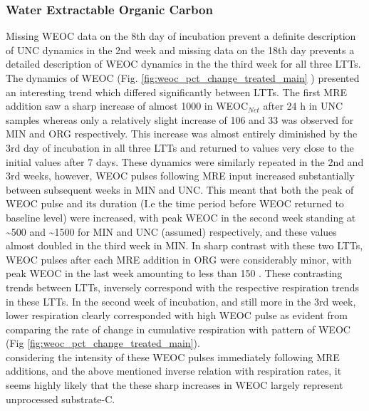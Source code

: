 		\subsubsection{Water Extractable Organic Carbon}

			Missing WEOC data on the 8th day of incubation prevent a definite description of UNC dynamics in the 2nd week and missing data on the 18th day prevents a detailed description of WEOC dynamics in the the third week for all three LTTs. The dynamics of WEOC (Fig. \ref{fig:weoc_pct_change_treated_main} ) presented an interesting trend which differed significantly between LTTs. The first MRE addition saw a sharp increase of almost 1000 \genericunit in WEOC$_{Net}$ after 24 h in UNC samples whereas only a relatively slight increase of 106 and 33 \genericunit was observed for MIN and ORG respectively. This increase was almost entirely diminished by the 3rd day of incubation in all three LTTs and returned to values very close to the initial values after 7 days. These dynamics were similarly repeated in the 2nd and 3rd weeks, however, WEOC pulses following MRE input increased substantially between subsequent weeks in MIN and UNC. This meant that both the peak of WEOC pulse and its duration (I.e the time period before WEOC returned to baseline level) were increased, with peak WEOC in the second week standing at \~{}500 and \~{}1500 \genericunit for MIN and UNC (assumed) respectively, and these values almost doubled in the third week in MIN. In sharp contrast with these two LTTs, WEOC pulses after each MRE addition in ORG were considerably minor, with peak WEOC in the last week amounting to less than 150 \genericunit.
			These contrasting trends between LTTs, inversely correspond with the respective respiration trends in these LTTs. In the second week of incubation, and still more in the 3rd week, lower respiration clearly corresponded with high WEOC pulse as evident from comparing the rate of change in cumulative respiration with pattern of WEOC (Fig \ref{fig:weoc_pct_change_treated_main}).\\
			considering the intensity of these WEOC pulses immediately following MRE additions, and the above mentioned inverse relation with respiration rates, it seems highly likely that the these sharp increases in WEOC largely represent unprocessed substrate-C.
%
